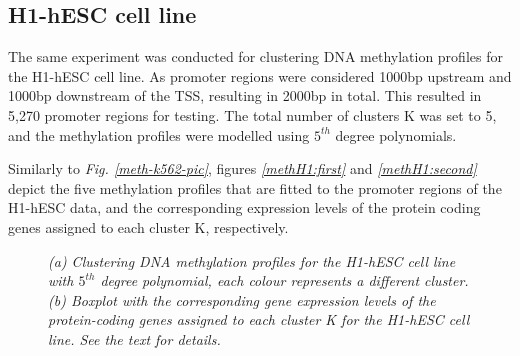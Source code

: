 \subsection{H1-hESC cell line} \label{meth-encode-h1-subsect}
The same experiment was conducted for clustering DNA methylation profiles for the H1-hESC cell line. As promoter regions were considered 1000bp upstream and 1000bp downstream of the TSS, resulting in 2000bp in total. This resulted in 5,270 promoter regions for testing. The total number of clusters K was set to 5, and the methylation profiles were modelled using $5^{th}$ degree polynomials. 

Similarly to \emph{Fig. \ref{meth-k562-pic}}, figures \emph{\ref{methH1:first}} and \emph{\ref{methH1:second}} depict the five methylation profiles that are fitted to the promoter regions of the H1-hESC data, and the corresponding expression levels of the protein coding genes assigned to each cluster K, respectively.
\begin{figure}[ht!]
     \begin{center}
    \end{center}
    \caption{\emph{(a) Clustering DNA methylation profiles for the H1-hESC cell line with $5^{th}$ degree polynomial, each colour represents a different cluster. (b) Boxplot with the corresponding gene expression levels of the protein-coding genes assigned to each cluster K for the H1-hESC cell line. See the text for details.}}
   \label{meth-H1-pic}
\end{figure}